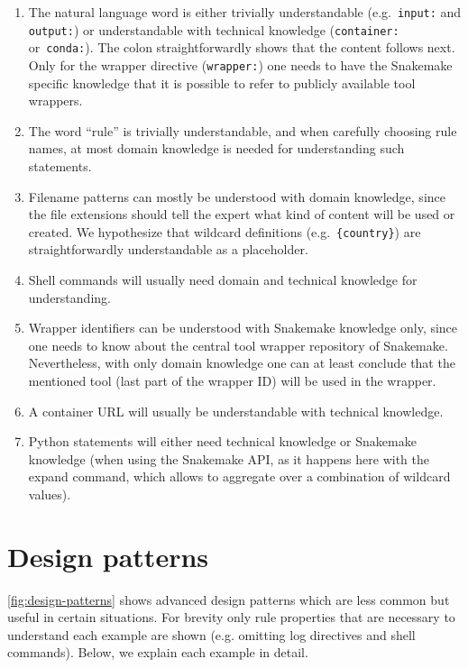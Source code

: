 \documentclass[10pt,a4paper,twocolumn]{article}
\begin{document}
\begin{enumerate}
	\item The natural language word is either trivially understandable (e.g.\ \lstinline!input:! and \lstinline!output:!) or understandable with technical knowledge (\lstinline!container:! or~\lstinline!conda:!).
	      The colon straightforwardly shows that the content follows next.
	      Only for the wrapper directive (\lstinline!wrapper:!) one needs to have the Snakemake specific knowledge that it is possible to refer to publicly available tool wrappers.
	\item
	      The word ``rule'' is trivially understandable, and when
	      carefully choosing rule names, at most domain knowledge is needed for
	      understanding such statements.
	\item
	      Filename patterns can mostly be understood with domain knowledge,
	      since the file extensions should tell the expert what kind of content
	      will be used or created.
	      We hypothesize that wildcard definitions (e.g.~\lstinline!{country}!) are straightforwardly understandable as a placeholder.
	\item
	      Shell commands will usually need domain and technical knowledge for
	      understanding.
	\item
	      Wrapper identifiers can be understood with Snakemake knowledge only,
	      since one needs to know about the central tool wrapper repository of
	      Snakemake.
	      Nevertheless, with only domain knowledge one can at least conclude that the mentioned tool (last part of the wrapper ID) will be used in the wrapper.
	\item
	      A container URL will usually be understandable with technical
	      knowledge.
	\item
	      Python statements will either need technical knowledge or Snakemake
	      knowledge (when using the Snakemake API, as it happens here with the
	      expand command, which allows to aggregate over a combination of
	      wildcard values).
\end{enumerate}



\section{Design patterns}
\label{sec:design-patterns}

\autoref{fig:design-patterns} shows advanced design patterns which are less common but useful in certain situations.
For brevity only rule properties that are necessary to understand each example are shown (e.g. omitting log directives and shell commands).
Below, we explain each example in detail.
\end{document}
